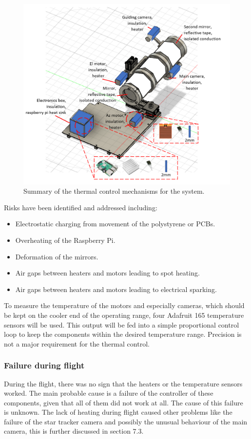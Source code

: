 \begin{figure}[H]
\centering
\includegraphics[scale=0.8]{4-experiment-design/img/mechanical/thermalsolutions.png}
\caption{Summary of the thermal control mechanisms for the system.}
\label{fig:thermalsolutions}
\end{figure}

Risks have been identified and addressed including:

\begin{itemize}
  \item Electrostatic charging from movement of the polystyrene or PCBs.
  \item Overheating of the Raspberry Pi.
  \item Deformation of the mirrors.
  \item Air gaps between heaters and motors leading to spot heating.
  \item Air gaps between heaters and motors leading to electrical sparking.

\end{itemize}

To measure the temperature of the motors and especially cameras, which should be kept on the cooler end of the operating range, four Adafruit 165 temperature sensors will be used. This output will be fed into a simple proportional control loop to keep the components within the desired temperature range. Precision is not a major requirement for the thermal control.

\subsubsection{Failure during flight}
During the flight, there was no sign that the heaters or the temperature sensors worked. The main probable cause is a failure of the controller of these components, given that all of them did not work at all. The cause of this failure is unknown. The lack of heating during flight caused other problems like the failure of the star tracker camera and possibly the unusual behaviour of the main camera, this is further discussed in section 7.3.
